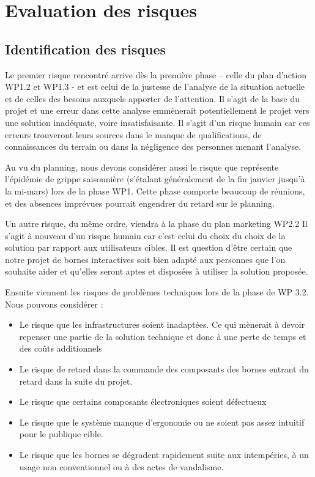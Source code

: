 \chapter{Evaluation des risques}

\section{Identification des risques}
Le premier risque rencontré   arrive dès  la première phase – celle du plan d’action WP1.2 et WP1.3 - et est celui de  la justesse de l’analyse de la situation actuelle  et de celles des besoins auxquels apporter de l’attention. Il s’agit  de la base du projet et une erreur dans cette analyse emmènerait potentiellement  le projet vers une solution inadéquate, voire insatisfaisante. Il s’agit d’un risque humain car ces erreurs trouveront leurs sources dans le manque de qualifications, de connaissances du terrain ou dans la négligence des personnes menant l’analyse. 
 
Au vu du planning, nous devons considérer aussi le risque que représente l’épidémie de grippe saisonnière (s’étalant généralement de la fin janvier jusqu’à la mi-mars) lors de la phase WP1.  Cette phase comporte beaucoup de réunions, et des  absences  imprévues pourrait engendrer du retard sur le planning. 

 

Un autre risque, du même ordre, viendra à la phase du plan marketing WP2.2  
Il s’agit à nouveau d’un risque humain car c’est celui du choix du choix de la solution par rapport aux utilisateurs cibles. Il est question d’être certain que notre projet de bornes interactives  soit bien adapté  aux personnes que l’on souhaite aider et qu’elles seront aptes et disposées à utiliser la solution proposée.  

 

Ensuite viennent les  risques de problèmes techniques lors de la phase de WP 3.2. Nous pouvons considérer : 

 \begin{itemize} 
    \item Le risque que les infrastructures soient inadaptées. Ce qui mènerait à devoir repenser une partie de la solution technique et donc à une perte de temps et  des coûts additionnels 
    
    \item Le risque de retard dans la commande des composants des bornes entrant du retard dans la suite du projet. 
    \item Le risque  que certains composants électroniques soient défectueux 

    \item Le risque que le système manque d’ergonomie ou ne soient pas assez intuitif pour le publique cible.  

    \item Le risque que les bornes se dégradent rapidement  suite  aux intempéries, à un usage non conventionnel ou à des actes de vandalisme. 

 \end{itemize}

